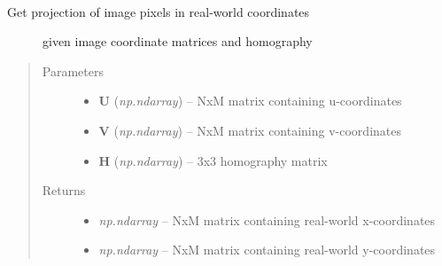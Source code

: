 \documentclass[letterpaper,10pt,english]{sphinxmanual}
\begin{document}
\begin{fulllineitems}
\label{rectification:flamingo.rectification.rectification.rectify_coordinates}~\begin{description}
\item[{Get projection of image pixels in real-world coordinates}] \leavevmode
given image coordinate matrices and  homography

\end{description}
\begin{quote}\begin{description}
\item[{Parameters}] \leavevmode\begin{itemize}
\item {} 
\textbf{U} (\emph{np.ndarray}) -- NxM matrix containing u-coordinates

\item {} 
\textbf{V} (\emph{np.ndarray}) -- NxM matrix containing v-coordinates

\item {} 
\textbf{H} (\emph{np.ndarray}) -- 3x3 homography matrix

\end{itemize}

\item[{Returns}] \leavevmode
\begin{itemize}
\item {} 
\emph{np.ndarray} --
NxM matrix containing real-world x-coordinates

\item {} 
\emph{np.ndarray} --
NxM matrix containing real-world y-coordinates

\end{itemize}


\end{description}\end{quote}

\end{fulllineitems}

\end{document}

